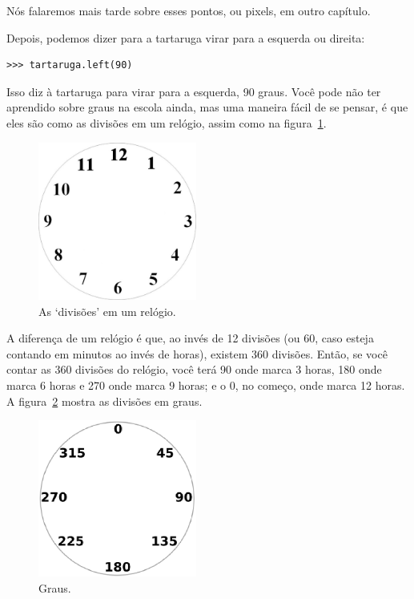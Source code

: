 Nós falaremos mais tarde sobre esses pontos, ou pixels, em outro capítulo.

Depois, podemos dizer para a tartaruga virar para a esquerda ou direita:

\begin{listing}
\begin{verbatim}
>>> tartaruga.left(90)
\end{verbatim}
\end{listing}

Isso diz à tartaruga para virar para a esquerda, 90 graus. Você pode não ter aprendido sobre graus na escola ainda, mas uma maneira fácil de se pensar, é que eles são como as divisões em um relógio, assim como na figura~\ref{fig13}.

\begin{figure}
\begin{center}
\includegraphics[width=52mm]{eps/figure13.eps}
\end{center}
\caption{As `divisões' em um relógio.}\label{fig13}
\end{figure}

A diferença de um relógio é que, ao invés de 12 divisões (ou 60, caso esteja contando em minutos ao invés de horas), existem 360 divisões. Então, se você contar as 360 divisões do relógio, você terá 90 onde marca 3 horas, 180 onde marca 6 horas e 270 onde marca 9 horas; e o 0, no começo, onde marca 12 horas. A figura~\ref{fig14} mostra as divisões em graus.

\begin{figure}
\begin{center}
\includegraphics[width=52mm]{eps/figure14.eps}
\end{center}
\caption{Graus.}\label{fig14}
\end{figure}

